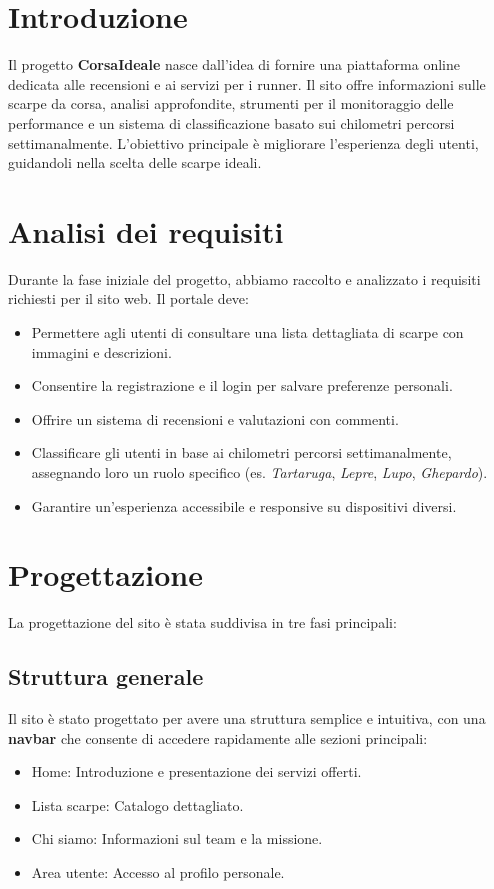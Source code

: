\documentclass[a4paper, 12pt]{article}
\begin{document}
\newpage
\tableofcontents

\newpage
\begin{justify}
    

\section{Introduzione}
Il progetto \textbf{CorsaIdeale} nasce dall'idea di fornire una piattaforma online dedicata alle recensioni e ai servizi per i runner. Il sito offre informazioni sulle scarpe da corsa, analisi approfondite, strumenti per il monitoraggio delle performance e un sistema di classificazione basato sui chilometri percorsi settimanalmente. L'obiettivo principale \`e migliorare l'esperienza degli utenti, guidandoli nella scelta delle scarpe ideali.

\section{Analisi dei requisiti}
Durante la fase iniziale del progetto, abbiamo raccolto e analizzato i requisiti richiesti per il sito web. Il portale deve:

\begin{itemize}
    \item Permettere agli utenti di consultare una lista dettagliata di scarpe con immagini e descrizioni.
    \item Consentire la registrazione e il login per salvare preferenze personali.
    \item Offrire un sistema di recensioni e valutazioni con commenti.
    \item Classificare gli utenti in base ai chilometri percorsi settimanalmente, assegnando loro un ruolo specifico (es. \textit{Tartaruga}, \textit{Lepre}, \textit{Lupo}, \textit{Ghepardo}).
    \item Garantire un'esperienza accessibile e responsive su dispositivi diversi.
\end{itemize}

\section{Progettazione}
La progettazione del sito \`e stata suddivisa in tre fasi principali:

\subsection{Struttura generale}
Il sito \`e stato progettato per avere una struttura semplice e intuitiva, con una \textbf{navbar} che consente di accedere rapidamente alle sezioni principali:
\begin{itemize}
    \item Home: Introduzione e presentazione dei servizi offerti.
    \item Lista scarpe: Catalogo dettagliato.
    \item Chi siamo: Informazioni sul team e la missione.
    \item Area utente: Accesso al profilo personale.
\end{itemize}


\end{justify}
\end{document}
